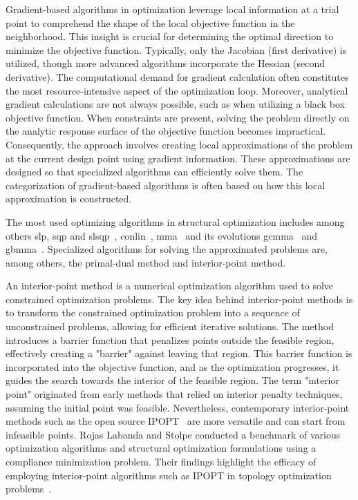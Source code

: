 Gradient-based algorithms in optimization leverage local information at a trial point to comprehend the shape of the local objective function in the neighborhood. This insight is crucial for determining the optimal direction to minimize the objective function. Typically, only the Jacobian (first derivative) is utilized, though more advanced algorithms incorporate the Hessian (second derivative). The computational demand for gradient calculation often constitutes the most resource-intensive aspect of the optimization loop. Moreover, analytical gradient calculations are not always possible, such as when utilizing a black box objective function. When constraints are present, solving the problem directly on the analytic response surface of the objective function becomes impractical. Consequently, the approach involves creating local approximations of the problem at the current design point using gradient information. These approximations are designed so that specialized algorithms can efficiently solve them. The categorization of gradient-based algorithms is often based on how this local approximation is constructed.

The most used optimizing algorithms in structural optimization includes among others \gls{slp}, \gls{sqp} and \gls{slsqp}~, \gls{conlin}~, \gls{mma}~ and its evolutions \gls{gcmma}~ and \gls{gbmma}~. Specialized algorithms for solving the approximated problems are, among others, the primal-dual method and interior-point method.

An interior-point method is a numerical optimization algorithm used to solve constrained optimization problems. The key idea behind interior-point methods is to transform the constrained optimization problem into a sequence of unconstrained problems, allowing for efficient iterative solutions. The method introduces a barrier function that penalizes points outside the feasible region, effectively creating a "barrier" against leaving that region. This barrier function is incorporated into the objective function, and as the optimization progresses, it guides the search towards the interior of the feasible region. The term "interior point" originated from early methods that relied on interior penalty techniques, assuming the initial point was feasible. Nevertheless, contemporary interior-point methods such as the open source IPOPT~ are more versatile and can start from infeasible points. Rojas Labanda and Stolpe conducted a benchmark of various optimization algorithms and structural optimization formulations using a compliance minimization problem. Their findings highlight the efficacy of employing interior-point algorithms such as IPOPT in topology optimization problems~.

